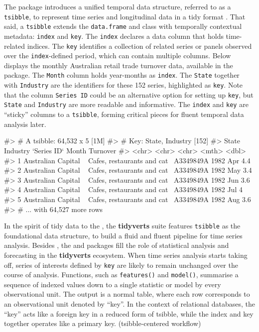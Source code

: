 The  package \citep{wang2020tsibble} introduces a
unified temporal data structure, referred to as a \texttt{tsibble}, to
represent time series and longitudinal data in a tidy format
\citep{wickham2014tidy}. That said, a \texttt{tsibble} extends the
\texttt{data.frame} and  class with temporally
contextual metadata: \texttt{index} and \texttt{key}. The \texttt{index}
declares a data column that holds time-related indices. The \texttt{key}
identifies a collection of related series or panels observed over the
\texttt{index}-defined period, which can contain multiple columns. Below
displays the monthly Australian retail trade turnover data, available in
the  package. The \texttt{Month} column holds
year-months as \texttt{index}. The \texttt{State} together with
\texttt{Industry} are the identifiers for these 152 series, highlighted
as \texttt{key}. Note that the column \texttt{Series\ ID} could be an
alternative option for setting up \texttt{key}, but \texttt{State} and
\texttt{Industry} are more readable and informative. The \texttt{index}
and \texttt{key} are ``sticky'' columns to a \texttt{tsibble}, forming
critical pieces for fluent temporal data analysis later.

\begin{Schunk}
\begin{Soutput}
#> # A tsibble: 64,532 x 5 [1M]
#> # Key:       State, Industry [152]
#>   State                Industry                    `Series ID`    Month Turnover
#>   <chr>                <chr>                       <chr>          <mth>    <dbl>
#> 1 Australian Capital ~ Cafes, restaurants and cat~ A3349849A   1982 Apr      4.4
#> 2 Australian Capital ~ Cafes, restaurants and cat~ A3349849A   1982 May      3.4
#> 3 Australian Capital ~ Cafes, restaurants and cat~ A3349849A   1982 Jun      3.6
#> 4 Australian Capital ~ Cafes, restaurants and cat~ A3349849A   1982 Jul      4  
#> 5 Australian Capital ~ Cafes, restaurants and cat~ A3349849A   1982 Aug      3.6
#> # ... with 64,527 more rows
\end{Soutput}
\end{Schunk}

In the spirit of tidy data to the 
\citep{Wickham2019}, the \textbf{tidyverts} suite features
\texttt{tsibble} as the foundational data structure, to build a fluid
and fluent pipeline for time series analysis. Besides ,
the  and  packages fill the role of
statistical analysis and forecasting in the \textbf{tidyverts}
ecosystem. When time series analysis starts taking off, series of
interests defined by \texttt{key} are likely to remain unchanged over
the course of analysis. Functions, such as \texttt{features()} and
\texttt{model()}, summarise a sequence of indexed values down to a
single statistic or model by every observational unit. The output is a
normal table, where each row corresponds to an observational unit
denoted by ``key''. In the context of relational databases, the ``key''
acts like a foreign key in a reduced form of tsibble, while the index
and key together operates like a primary key. (tsibble-centered
workflow)

